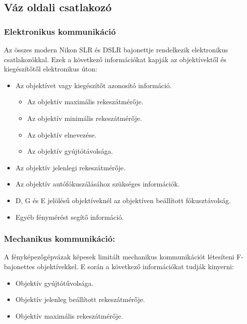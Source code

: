 \subsection{Váz oldali csatlakozó}
\subsubsection{Elektronikus kommunikáció}
Az összes modern Nikon SLR és DSLR bajonettje rendelkezik elektronikus csatlakozókkal. Ezek a következő információkat kapják az objektívektől és kiegészítőtől elektronikus úton:
\begin{itemize}
    \item Az objektívet vagy kiegészítőt azonosító információ.
    \begin{itemize}
        \item Az objektív maximális rekeszátmérője.
        \item Az objektív minimális rekeszátmérője.
        \item Az objektív elnevezése.
        \item Az objektív gyújtótávolsága.\cite{Nikon_naming_convention}
    \end{itemize}
    \item Az objektív jelenlegi rekeszátmérője.
    \item Az objektív autófókuszálásához szükséges információk.
    \item D, G és E jelölésű objektíveknél az objektíven beállított fókusztávolság.
    \item Egyéb fénymérést segítő információ.
\end{itemize}

\subsubsection{Mechanikus kommunikáció:}
A fényképezőgépvázak képesek limitált mechanikus kommunikációt létesíteni F-bajonettes objektívekkel. E során a következő információkat tudják kinyerni:
\begin{itemize}
    \item Objektív gyújtótűvolsága. \cite{Nikon_naming_convention}
    \item Objektív jelenleg beállított rekeszátmérője. \cite{Lens_naming}
    \item Objektív maximális rekeszátmérője. \cite{Lens_naming}
\end{itemize}

